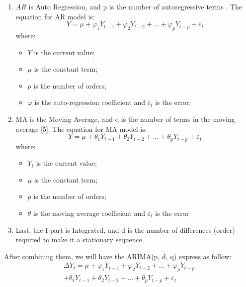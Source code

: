 \documentclass{ieeeojies}
\begin{document}
\begin{enumerate}
    \item$AR$ is Auto Regression, and p is the number of autoregressive terms \cite{b8}. The equation for AR model is:
          \begin{equation}
              Y = \mu + \varphi_1Y_{t-1} + \varphi_2Y_{t-2} + ... + \varphi_pY_{t-p} + \varepsilon_t
          \end{equation}
          where:
          \begin{itemize}
              \item $Y$ is the current value;
              \item $\mu$ is the constant term;
              \item $p$ is the number of orders;
              \item $\varphi$ is the auto-regression coefficient and $\varepsilon_t$ is the error;
          \end{itemize}
    \item MA is the Moving Average, and q is the number of terms in the moving average [5]. The equation for MA model is:
          \begin{equation}
              Y = \mu + \theta_1Y_{t-1} + \theta_2Y_{t-2} + ... + \theta_pY_{t-p} + \varepsilon_t
          \end{equation}
          where:
          \begin{itemize}
              \item $Y_t$ is the current value;
              \item $\mu$ is the constant term;
              \item $p$ is the number of orders;
              \item $\theta$ is the moving average coefficient and $\varepsilon_t$ is the error
          \end{itemize}
    \item Last, the I part is Integrated, and d is the number of differences (order) required to make it a stationary sequence.
\end{enumerate}

After combining them, we will have the ARIMA(p, d, q) express as follow:
\begin{equation}
    \begin{aligned}
        \Delta Y_t = \mu + \varphi_1Y_{t-1} + \varphi_2Y_{t-2} + ... +\varphi_pY_{t-p} \\
        + \theta_1Y_{t-1} + \theta_2Y_{t-2} + ... + \theta_pY_{t-p} + \varepsilon_t
    \end{aligned}
\end{equation}
\end{document}
